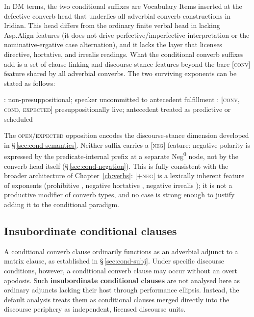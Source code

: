 In DM terms, the two conditional suffixes are Vocabulary Items inserted at
the defective converb head that underlies all adverbial converb constructions
in Iridian. This head differs from the ordinary finite verbal head in
lacking Asp.Align features (it does not drive perfective/imperfective
interpretation or the nominative-ergative case alternation), and it lacks
the  layer that licenses directive, hortative, and irrealis readings.
What the conditional converb suffixes add is a set of clause-linking and
discourse-stance features beyond the bare \textsc{[conv]} feature shared
by all adverbial converbs. The two surviving exponents can be stated as
follows:

\pex
\a {}: 
\hfill non-presuppositional; speaker uncommitted to antecedent fulfillment
\a {}: [\textsc{conv}, \textsc{cond}, \textsc{expected}]
\hfill presuppositionally live; antecedent treated as predictive or scheduled
\xe

The \textsc{open}/\textsc{expected} opposition encodes the discourse-stance
dimension developed in §\,\ref{sec:cond-semantics}. Neither suffix carries
a [\textsc{neg}] feature: negative polarity is expressed by the
predicate-internal prefix  at a separate Neg\textsuperscript{0} node, not by
the converb head itself (§\,\ref{sec:cond-negation}). This is fully
consistent with the broader architecture of Chapter~\ref{ch:verbs}:
[\textsc{+neg}] is a lexically inherent feature of  exponents
(prohibitive , negative hortative , negative irrealis
); it is not a productive modifier of converb types, and no
case is strong enough to justify adding it to the conditional paradigm.

\subsection{Insubordinate conditional clauses}\label{sec:cond-insub}

A conditional converb clause ordinarily functions as an adverbial adjunct
to a matrix clause, as established in §\,\ref{sec:cond-subj}. Under
specific discourse conditions, however, a conditional converb clause may
occur without an overt apodosis. Such \textbf{insubordinate conditional
clauses} are not analysed here as ordinary adjuncts lacking their host
through performance ellipsis. Instead, the default analysis treats them as
conditional clauses merged directly into the discourse periphery as
independent, licensed discourse units.

